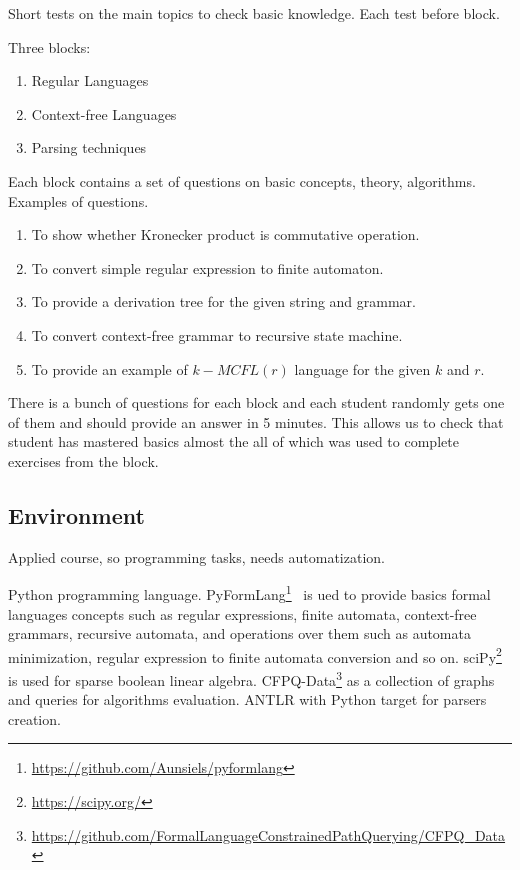 \documentclass[sigconf]{acmart}
\begin{document}
Short tests on the main topics to check basic knowledge.
Each test before block. 

Three blocks:
\begin{enumerate}
  \item Regular Languages
  \item Context-free Languages
  \item Parsing techniques
\end{enumerate}

Each block contains a set of questions on basic concepts, theory, algorithms.
Examples of questions.
\begin{enumerate}
   \item To show whether Kronecker product is commutative operation. 
   \item To convert simple regular expression to finite automaton.
   \item To provide a derivation tree for the given string and grammar.
   \item To convert context-free grammar to recursive state machine.
   \item To provide an example of $k-MCFL(r)$ language for the given $k$ and $r$.
\end{enumerate} 

There is a bunch of questions for each block and each student randomly gets one of them and should provide an answer in 5 minutes. 
This allows us to check that student has mastered basics almost the all of which was used to complete exercises from the block.

\subsection{Environment}

Applied course, so programming tasks, needs automatization.

Python programming language.
PyFormLang\footnote{\url{https://github.com/Aunsiels/pyformlang}}~\cite{10.1145/3408877.3432464} is ued to provide basics formal languages concepts such as regular expressions, finite automata, context-free grammars, recursive automata, and operations over them such as automata minimization, regular expression to finite automata conversion and so on.
sciPy\footnote{\url{https://scipy.org/}} is used for sparse boolean linear algebra.
CFPQ-Data\footnote{\url{https://github.com/FormalLanguageConstrainedPathQuerying/CFPQ_Data}} as a collection of graphs and queries for algorithms evaluation.
ANTLR with Python target for parsers creation.
\end{document}
